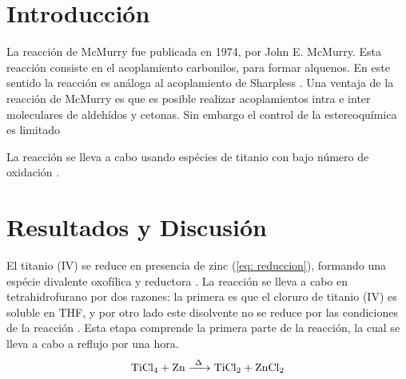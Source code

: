 \documentclass[fleqn,10pt]{SelfArx}
\begin{document}
\flushbottom %

\maketitle %


\thispagestyle{empty} %




\section*{Introducci\'on} %

La reacci\'on de McMurry fue publicada en 1974, por John E. McMurry. Esta reacci\'on consiste en el acoplamiento carbonilos, para formar alquenos. En este sentido la reacci\'on es an\'aloga al acoplamiento de Sharpless \cite{doi:10.1021/ja00188a068}. Una ventaja de la reacci\'on de McMurry es que es posible realizar acoplamientos intra e inter moleculares de aldeh\'idos y cetonas. Sin embargo el control de la estereoqu\'imica es limitado

La reacci\'on se lleva a cabo usando esp\'ecies de titanio con bajo n\'umero de oxidaci\'on . 

\section{Resultados y Discusi\'on}

El titanio (IV) se reduce en presencia de zinc (\autoref{eq: reduccion}), formando una esp\'ecie divalente oxof\'ilica y reductora \cite{richards2001}. La reacci\'on se lleva a cabo en tetrahidrofurano por dos razones: la primera es que el cloruro de titanio (IV) es soluble en THF, y por otro lado este disolvente no se reduce por las condiciones de la reacci\'on \cite{richards2001}. Esta etapa comprende la primera parte de la reacci\'on, la cual se lleva a cabo a reflujo por una hora.
\begin{equation}\label{eq: reduccion}
	\ce{TiCl_4 + Zn ->[\Delta] TiCl2 + ZnCl2}
\end{equation}
\end{document}
